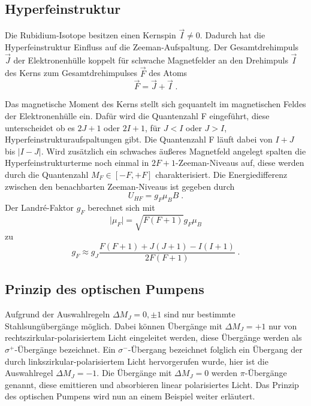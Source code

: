 \subsection{Hyperfeinstruktur}
Die Rubidium-Isotope besitzen einen Kernspin $\vec{I} \neq 0$. Dadurch hat die Hyperfeinstruktur 
Einfluss auf die Zeeman-Aufspaltung. Der Gesamtdrehimpuls $\vec{J}$ der Elektronenhülle koppelt 
für schwache Magnetfelder an den Drehimpuls $\vec{I}$ des Kerns zum Gesamtdrehimpulses $\vec{F}$ 
des Atoms
\begin{equation}
\vec{F} = \vec{J} + \vec{I} \; .
\label{eq:F}
\end{equation}

Das magnetische Moment des Kerns stellt sich gequantelt im magnetischen Feldes der Elektronenhülle 
ein. Dafür wird die Quantenzahl F eingeführt, diese unterscheidet ob es $2J+1$ oder $2I+1$, 
für $J<I$ oder $J>I$, Hyperfeinstrukturaufspaltungen gibt. Die Quantenzahl F läuft dabei 
von $I+J$ bis $\lvert I-J \rvert$. Wird zusätzlich ein schwaches äußeres Magnetfeld angelegt 
spalten die Hyperfeinstrukturterme noch einmal in $2F+1$-Zeeman-Niveaus auf, diese werden durch 
die Quantenzahl $M_F \in [-F,+F]$ charakterisiert. Die Energiedifferenz zwischen den benachbarten 
Zeeman-Niveaus ist gegeben durch 
\begin{equation}
U_{HF} = g_F \mu_B B \; .
\label{eq:UHF}
\end{equation}
Der Landr\'{e}-Faktor $g_F$ berechnet sich mit
\begin{equation}
\lvert \mu_F \rvert = \sqrt{F(F+1)} g_F \mu_B
\label{eq:muF}
\end{equation}
zu
\begin{equation}
g_F \approx g_J \frac{F(F+1) + J(J+1) -I(I+1)}{2F(F+1)} \; .
\label{eq:gF}
\end{equation}

\subsection{Prinzip des optischen Pumpens}
Aufgrund der Auswahlregeln $\Delta M_J = 0, \pm 1$ sind nur bestimmte Stahlsungübergänge möglich. 
Dabei können Übergänge mit $\Delta M_J = +1$ nur von rechtszirkular-polarisiertem Licht 
eingeleitet werden, diese Übergänge werden als $\sigma^+$-Übergänge bezeichnet. Ein 
$\sigma^-$-Übergang bezeichnet folglich ein Übergang der durch linkszirkular-polarisiertem 
Licht hervorgerufen wurde, hier ist die Auswahlregel $\Delta M_J = -1$. Die Übergänge mit 
$\Delta M_J = 0$ werden $\pi$-Übergänge genannt, diese emittieren und absorbieren 
linear polarisiertes Licht. Das Prinzip des optischen Pumpens wird nun an einem 
Beispiel weiter erläutert.
